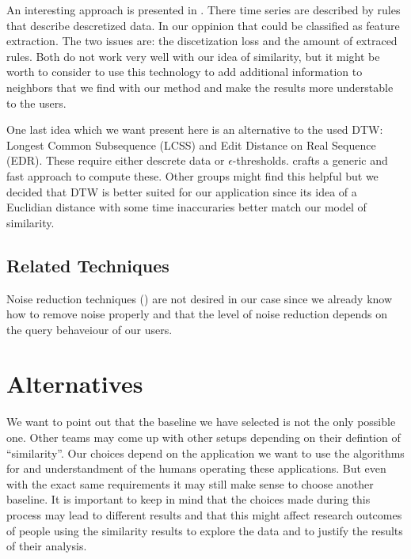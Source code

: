 An interesting approach is presented in \cite{sim2}. There time series are described by rules that describe descretized data. In our oppinion that could be classified as feature extraction. The two issues are: the discetization loss and the amount of extraced rules. Both do not work very well with our idea of similarity, but it might be worth to consider to use this technology to add additional information to neighbors that we find with our method and make the results more understable to the users.

One last idea which we want present here is an alternative to the used DTW: Longest Common Subsequence (LCSS) and Edit Distance on Real Sequence (EDR). These require either descrete data or $\epsilon$-thresholds. \cite{sim3} crafts a generic and fast approach to compute these. Other groups might find this helpful but we decided that DTW is better suited for our application since its idea of a Euclidian distance with some time inaccuraries better match our model of similarity.


\subsection{Related Techniques}
\label{ssec:baseline:prior:other}

Noise reduction techniques (\cite{noise1}) are not desired in our case since we already know how to remove noise properly and that the level of noise reduction depends on the query behaveiour of our users.



\section{Alternatives}
\label{sec:baseline:alt}
We want to point out that the baseline we have selected is not the only possible one. Other teams may come up with other setups depending on their defintion of \enquote{similarity}. Our choices depend on the application we want to use the algorithms for and understandment of the humans operating these applications. But even with the exact same requirements it may still make sense to choose another baseline. It is important to keep in mind that the choices made during this process may lead to different results and that this might affect research outcomes of people using the similarity results to explore the data and to justify the results of their analysis.
